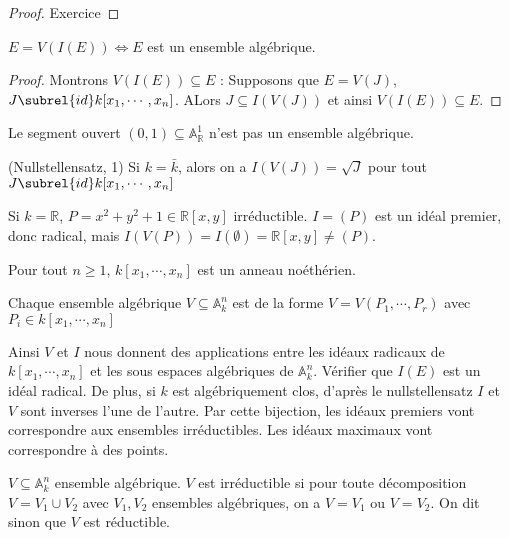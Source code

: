         \begin{proof}
            Exercice
        \end{proof}
        \begin{lemm}
            $E = V(I(E)) \iff E$ est un ensemble algébrique. 
        \end{lemm}
        \begin{proof}
            Montrons $V(I(E)) \subseteq E$ : Supposons que $E = V(J)$, $J \subrel{id} k[x_1, \cdots, x_n]$. ALors $J \subseteq I(V(J))$ et ainsi $V(I(E)) \subseteq E$.
        \end{proof}
        \begin{expl}
            Le segment ouvert $(0,1) \subseteq \mathbb{A}_\mathbb{R}^1$ n'est pas un ensemble algébrique.
        \end{expl}
        \begin{theo} (Nullstellensatz, 1)
            \label{Null_1}
            Si $k = \bar k$, alors on a $I(V(J)) = \sqrt{J}$ pour tout $J \subrel{id} k[x_1, \cdots, x_n]$
        \end{theo}
        \begin{expl}
            Si $k = \mathbb{R}$, $P = x^2 + y^2 + 1 \in \mathbb{R}[x,y]$ irréductible. $I = (P)$ est un idéal premier, donc radical, mais $I(V(P)) = I(\emptyset) = \mathbb{R}[x,y] \neq (P)$.
        \end{expl}
        \begin{theo}
            Pour tout $n \geq 1$, $k[x_1, \cdots, x_n]$ est un anneau noéthérien.
        \end{theo}
        \begin{coro}
            Chaque ensemble algébrique $V \subseteq \mathbb{A}_k^n$ est de la forme $V = V(P_1, \cdots, P_r)$ avec $P_i \in k[x_1, \cdots, x_n]$
        \end{coro}
        Ainsi $V$ et $I$ nous donnent des applications entre les idéaux radicaux de $k[x_1, \cdots, x_n]$ et les sous espaces algébriques de $\mathbb{A}_k^n$. Vérifier que $I(E)$ est un idéal radical. De plus, si $k$ est algébriquement clos, d'après le nullstellensatz $I$ et $V$ sont inverses l'une de l'autre. Par cette bijection, les idéaux premiers vont correspondre aux ensembles irréductibles. Les idéaux maximaux vont correspondre à des points.
        \begin{defi}
            $V \subseteq \mathbb{A}_k^n$ ensemble algébrique. $V$ est irréductible si pour toute décomposition $V = V_1 \cup V_2$ avec $V_1,V_2$ ensembles algébriques, on a $V = V_1$ ou $V = V_2$. On dit sinon que $V$ est réductible.
        \end{defi}
